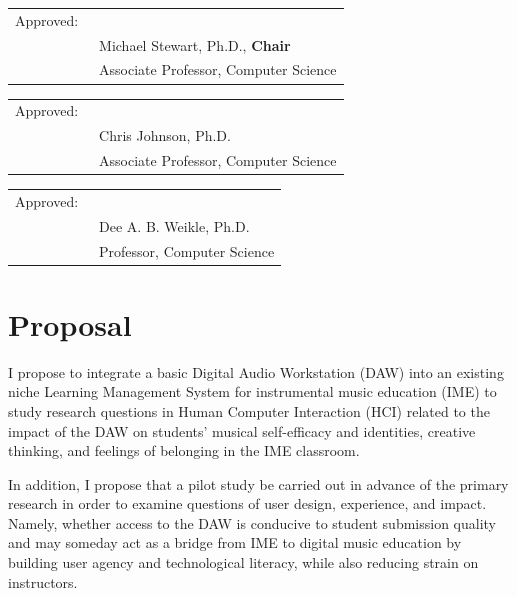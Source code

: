 \documentclass[manuscript,screen,review]{acmart}
\begin{document}
\begin{centering}
\begin{tabular}{lp{.5\linewidth}@{}}
Approved:~ & \\[-3pt]\cmidrule{2-2} 
& Michael Stewart, Ph.D., \textbf{Chair}\\
& Associate Professor, Computer Science\\
\end{tabular}

\begin{tabular}{lp{.5\linewidth}@{}}
Approved:~ & \\[-3pt]\cmidrule{2-2} 
& Chris Johnson, Ph.D.\\
& Associate Professor, Computer Science\\
\end{tabular}

\begin{tabular}{lp{.5\linewidth}@{}}
Approved:~ & \\[-3pt]\cmidrule{2-2} 
& Dee A. B. Weikle, Ph.D.\\
& Professor, Computer Science\\
\end{tabular}

\end{centering}


\section*{Proposal}
I propose to integrate a basic Digital Audio Workstation (DAW) into an existing niche Learning Management System for instrumental music education (IME) to study research questions in Human Computer Interaction (HCI) related to the impact of the DAW on students' musical self-efficacy and identities, creative thinking, and feelings of belonging in the IME classroom.

In addition, I propose that a pilot study be carried out in advance of the primary research in order to examine questions of user design, experience, and impact. Namely, whether access to the DAW is conducive to student submission quality and may someday act as a bridge from IME to digital music education by building user agency and technological literacy, while also reducing strain on instructors.  

\pagebreak
\end{document}
